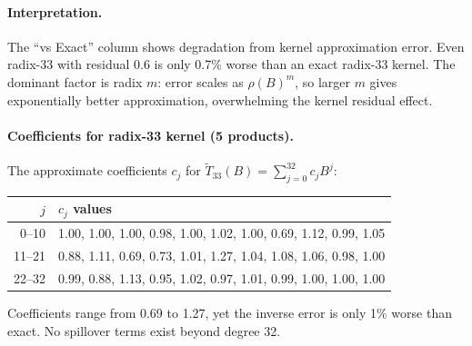 \documentclass[
  journal=largetwo,
  manuscript=article,
  manuscriptlabel={Research Preprint},
  logo=false,
  simfonts=false,
  year=2026,
  volume=1,
]{cup-journal}
\theoremstyle{definition}
\theoremstyle{remark}
\begin{document}
\begin{table}[ht]
\centering
\caption{Inverse approximation error (spectral norm) for single kernel
application. ``vs Exact'': ratio to exact Neumann at same radix.}
\label{tab:approx}
\end{table}

\paragraph{Interpretation.}
The ``vs Exact'' column shows degradation from kernel approximation error.
Even radix-33 with residual 0.6 is only 0.7\% worse than an exact radix-33 kernel.
The dominant factor is radix $m$: error scales as $\rho(B)^m$, so larger $m$
gives exponentially better approximation, overwhelming the kernel residual effect.

\paragraph{Coefficients for radix-33 kernel (5 products).}
The approximate coefficients $c_j$ for $\widetilde{T}_{33}(B) = \sum_{j=0}^{32} c_j B^j$:
\begin{table}[ht]
\centering
\small
\begin{tabular}{@{}r l@{}}
\toprule
$j$ & $c_j$ values \\
\midrule
0--10 & 1.00, 1.00, 1.00, 0.98, 1.00, 1.02, 1.00, 0.69, 1.12, 0.99, 1.05 \\
11--21 & 0.88, 1.11, 0.69, 0.73, 1.01, 1.27, 1.04, 1.08, 1.06, 0.98, 1.00 \\
22--32 & 0.99, 0.88, 1.13, 0.95, 1.02, 0.97, 1.01, 0.99, 1.00, 1.00, 1.00 \\
\bottomrule
\end{tabular}
\end{table}
Coefficients range from 0.69 to 1.27, yet the inverse error is only 1\% worse
than exact. No spillover terms exist beyond degree 32.
\end{document}
